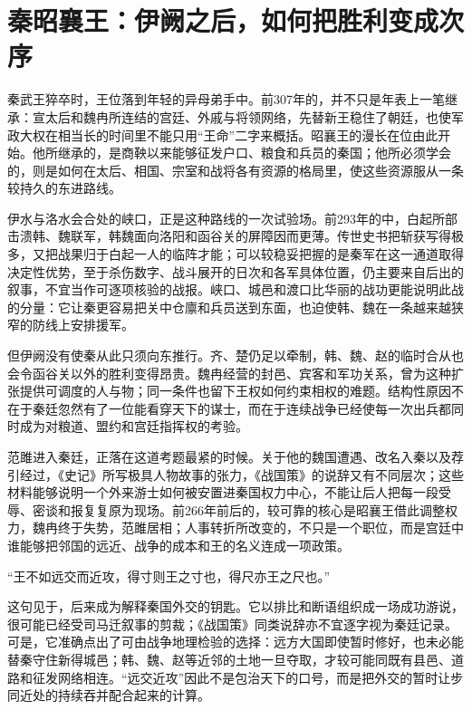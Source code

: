 \section{秦昭襄王：伊阙之后，如何把胜利变成次序}

秦武王猝卒时，王位落到年轻的异母弟手中。前307年的，并不只是年表上一笔继承：宣太后和魏冉所连结的宫廷、外戚与将领网络，先替新王稳住了朝廷，也使军政大权在相当长的时间里不能只用“王命”二字来概括。昭襄王的漫长在位由此开始。他所继承的，是商鞅以来能够征发户口、粮食和兵员的秦国；他所必须学会的，则是如何在太后、相国、宗室和战将各有资源的格局里，使这些资源服从一条较持久的东进路线。

伊水与洛水会合处的峡口，正是这种路线的一次试验场。前293年的中，白起所部击溃韩、魏联军，韩魏面向洛阳和函谷关的屏障因而更薄。传世史书把斩获写得极多，又把战果归于白起一人的临阵才能；可以较稳妥把握的是秦军在这一通道取得决定性优势，至于杀伤数字、战斗展开的日次和各军具体位置，仍主要来自后出的叙事，不宜当作可逐项核验的战报。峡口、城邑和渡口比华丽的战功更能说明此战的分量：它让秦更容易把关中仓廪和兵员送到东面，也迫使韩、魏在一条越来越狭窄的防线上安排援军。



但伊阙没有使秦从此只须向东推行。齐、楚仍足以牵制，韩、魏、赵的临时合从也会令函谷关以外的胜利变得昂贵。魏冉经营的封邑、宾客和军功关系，曾为这种扩张提供可调度的人与物；同一条件也留下王权如何约束相权的难题。结构性原因不在于秦廷忽然有了一位能看穿天下的谋士，而在于连续战争已经使每一次出兵都同时成为对粮道、盟约和宫廷指挥权的考验。

范雎进入秦廷，正落在这道考题最紧的时候。关于他的魏国遭遇、改名入秦以及荐引经过，《史记》所写极具人物故事的张力，《战国策》的说辞又有不同层次；这些材料能够说明一个外来游士如何被安置进秦国权力中心，不能让后人把每一段受辱、密谈和报复复原为现场。前266年前后的，较可靠的核心是昭襄王借此调整权力，魏冉终于失势，范雎居相；人事转折所改变的，不只是一个职位，而是宫廷中谁能够把邻国的远近、战争的成本和王的名义连成一项政策。

\begin{textwindow}[《史记》中的一句方略]
“王不如远交而近攻，得寸则王之寸也，得尺亦王之尺也。”

这句见于，后来成为解释秦国外交的钥匙。它以排比和断语组织成一场成功游说，很可能已经受司马迁叙事的剪裁；《战国策》同类说辞亦不宜逐字视为秦廷记录。可是，它准确点出了可由战争地理检验的选择：远方大国即使暂时修好，也未必能替秦守住新得城邑；韩、魏、赵等近邻的土地一旦夺取，才较可能同既有县邑、道路和征发网络相连。“远交近攻”因此不是包治天下的口号，而是把外交的暂时让步同近处的持续吞并配合起来的计算。
\end{textwindow}

